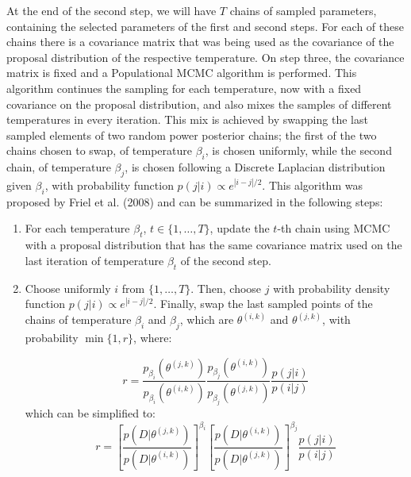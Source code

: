 At the end of the second step, we will have $T$ chains of sampled 
parameters, containing the selected parameters of the first and second 
steps. For each of these chains there is a covariance matrix that was
being used as the covariance of the proposal distribution of the 
respective temperature. On step three, the covariance matrix is fixed 
and a Populational MCMC algorithm is performed. This algorithm continues 
the sampling for each temperature, now with a fixed covariance on the 
proposal distribution, and also mixes the samples of different 
temperatures in every iteration. This mix is achieved by swapping the 
last sampled elements of two random power posterior chains; the first of
the two chains chosen to swap, of temperature $\beta_i$, is chosen 
uniformly, while the second chain, of temperature $\beta_j$, is chosen 
following a Discrete Laplacian distribution given $\beta_i$, with 
probability function $p (j | i) \propto e^{|i - j| / 2}$. This algorithm 
was proposed by Friel et al. (2008) and can be summarized in the 
following steps:
\begin{enumerate}
    \item{For each temperature $\beta_t$, $t \in \{1, \ldots, T\}$, 
        update the $t$-th chain using MCMC with a proposal distribution
        that has the same covariance matrix used on the last iteration
        of temperature $\beta_t$ of the second step.}
    \item{Choose uniformly $i$ from $\{1, \ldots, T\}$. Then, choose
        $j$ with probability density function $p (j | i) \propto 
        e^{|i - j| / 2}$. Finally, swap the last sampled points of 
        the chains of temperature $\beta_i$ and $\beta_j$, which are
        $\theta^{(i, k)}$ and $\theta^{(j, k)}$, with probability 
        $\min\{1, r\}$, where: }

    \begin{equation*}
        r = \frac{p_{\beta_i}\left(\theta^{(j, k)}\right)}
             {p_{\beta_i}\left(\theta^{(i, k)}\right)}
        \frac{p_{\beta_j}\left(\theta^{(i, k)}\right)}
             {p_{\beta_j}\left(\theta^{(j, k)}\right)}
        \frac{p (j | i)}
             {p (i | j)}
    \end{equation*}
    which can be simplified to:
    \begin{equation*}
        r = \left[\frac{p \left(D | \theta^{(j, k)}\right)}
                {p \left(D | \theta^{(i, k)}\right)}\right]^{\beta_i}
            \left[\frac{p \left(D | \theta^{(i, k)}\right)}
                {p \left(D | \theta^{(j, k)}\right)}\right]^{\beta_j}
            \frac{p (j | i)}
                 {p (i | j)}
    \end{equation*}
\end{enumerate}

